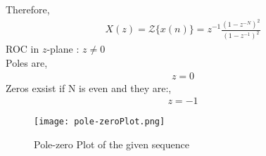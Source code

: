 \documentclass[journal,12pt,twocolumn]{IEEEtran}
\begin{document}
Therefore,
\begin{align}
    X(z) =  \mathcal{Z}\{x(n)\} = z^{-1}\frac{(1-z^{-N})^2}{(1-z^{-1})^2}
\end{align}
ROC in $z$-plane : $z \neq 0 $\\
Poles are,
\begin{align}
    z = 0 
\end{align}
Zeros exsist if N is even and they are:,
\begin{align}
    z = -1
\end{align}
\begin{figure}[h!]
\centering
\texttt{[image: pole-zeroPlot.png]}
\caption{Pole-zero Plot of the given sequence}
\label{fig:ellipse}
\end{figure}
\end{document}

